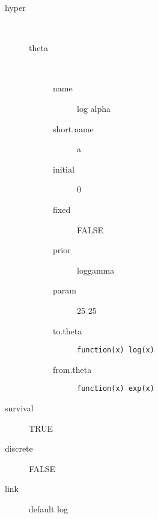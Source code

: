 \begin{description}
	\item[hyper]\ 
	 \begin{description}
	 	\item[theta]\ 
	 	 \begin{description}
	 	 	 \item[ name ] log alpha 
	 	 	 \item[ short.name ] a 
	 	 	 \item[ initial ] 0 
	 	 	 \item[ fixed ] FALSE 
	 	 	 \item[ prior ] loggamma 
	 	 	 \item[ param ] 25 25 
	 	 	 \item[ to.theta ] \verb|function(x) log(x)| 
	 	 	 \item[ from.theta ] \verb|function(x) exp(x)| 
	 	 \end{description}
	 \end{description}
	 \item[ survival ] TRUE 
	 \item[ discrete ] FALSE 
	 \item[ link ] default log 
\end{description}
